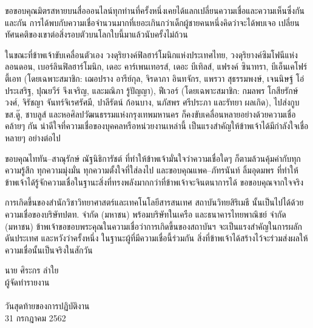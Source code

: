 \documentclass[16pt,a4]{internshipreport}
\begin{document}
ขอขอบคุณมิตรสหายบนสื่อออนไลน์ทุกท่านที่ครั้งหนึ่งเคยได้แลกเปลี่ยนความเชื่อและความเห็นซึ่งกันและกัน การได้พบกับความเชื่อจำนวนมากที่เยอะเกินกว่าเด็กผู้ชายคนหนึ่งคิดว่าจะได้พบเจอ เปลี่ยนทัศนคติของเขาต่อสิ่งรอบตัวบนโลกใบนี้มาแล้วนับครั้งไม่ถ้วน

ในขณะที่ข้าพเจ้าขับเคลื่อนตัวเอง วงดุริยางค์ฟิลฮาร์โมนิกแห่งประเทศไทย, วงดุริยางค์ซิมโฟนีแห่งลอนดอน, เบอร์ลินฟิลฮาร์โมนิก, เดอะ คาร์เพนเทอรส์, เดอะ บีเทิลส์, แฟรงค์ ซินาทรา, บีเอ็นเคโฟร์ตี้เอท (โดยเฉพาะสมาชิก: เฌอปราง อารีย์กุล, จิรดาภา อินทจักร, แพรวา สุธรรมพงษ์, เจนนิษฐ์ โอ่ประเสริฐ, ปุณยวีร์ จึงเจริญ, และมณิภา รู้ปัญญา), ฟีเวอร์ (โดยเฉพาะสมาชิก: กมลพร โกสียรักษ์วงศ์, จิรัชญา จันทร์จิเรศรัศมี, ปาลีรัตน์ ก้อนบาง, นภัสพร ศรีประภา และรัทยา ผลเกิด), ไปส่งกูบขส.ดู๊, ชาบลูส์ และหอศิลปวัฒนธรรมแห่งกรุงเทพมหานคร ก็คงขับเคลื่อนหลายอย่างด้วยความเชื่อคล้ายๆ กัน น่าดีใจที่ความเชื่อของบุคคลหรือหน่วยงานเหล่านี้ เป็นแรงสำคัญให้ข้าพเจ้าได้มีกำลังใจเชื่อหลายๆ อย่างต่อไป

ขอบคุณไททัน--สาณุรักษ์ ณัฐนิธิการัชต์ ที่ทำให้ข้าพเจ้ามั่นใจว่าความเชื่อใดๆ ก็ตามล้วนคุ้มค่ากับทุกความรู้สึก ทุกความมุ่งมั่น ทุกความตั้งใจที่ใส่ลงไป และขอบคุณแพค--ภัทรนันท์ ลิ้มอุดมพร ที่ทำให้ข้าพเจ้าได้รู้จักความเชื่อในฐานะสิ่งที่ทรงพลังมากกว่าที่ข้าพเจ้าจะจินตนาการได้ ขอขอบคุณจากใจจริง

การเกิดขึ้นของสำนักวิชาวิทยาศาสตร์และเทคโนโลยีสารสนเทศ สถาบันวิทยสิริเมธี นั้นเป็นไปได้ด้วยความเชื่อของบริษัทปตท. จำกัด (มหาชน) พร้อมบริษัทในเครือ และธนาคารไทยพาณิชย์ จำกัด (มหาชน)  ข้าพเจ้าขอขอบพระคุณในความเชื่อว่าการเกิดขี้นของสถาบันฯ จะเป็นแรงสำคัญในการผลักดันประเทศ และหวังว่าครั้งหนึ่ง ในฐานะผู้ที่มีความเชื่อนี้ร่วมกัน สิ่งที่ข้าพเจ้าได้สร้างไว้จะร่วมส่งผลให้ความเชื่อนั้นเป็นจริงในสักวัน

\vskip 20pt

\hfill\begin{minipage}
    {\dimexpr 5cm}
    \begin{center}
        นาย ศิระกร ลำใย\\
        ผู้จัดทำรายงาน\\~\\

        วันสุดท้ายของการปฏิบัติงาน\\
        31 กรกฎาคม 2562
    \end{center}
    \xdef\tpd{\the\prevdepth}
\end{minipage}


\tableofcontents

\listoffigures

\listoftables
\end{document}
